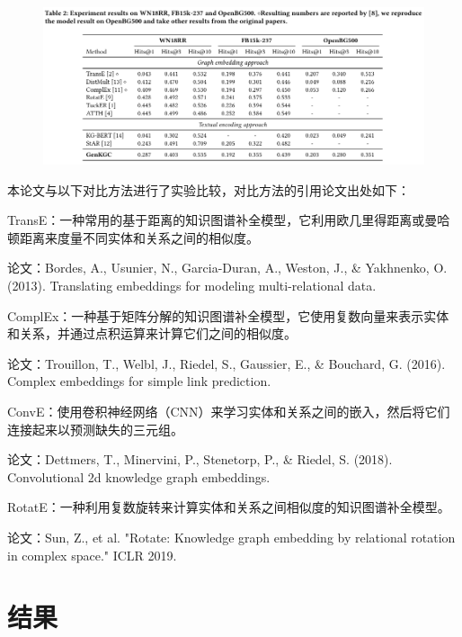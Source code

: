 \documentclass{article}
\begin{document}
\begin{figure}[htp]
        \centering
        \includegraphics[width=16cm]{模型对比.png}
        \caption{}
        \label{pic7}
\end{figure}
\par 本论文与以下对比方法进行了实验比较，对比方法的引用论文出处如下：
\par TransE：一种常用的基于距离的知识图谱补全模型，它利用欧几里得距离或曼哈顿距离来度量不同实体和关系之间的相似度。
\par
论文：Bordes, A., Usunier, N., Garcia-Duran, A., Weston, J., & Yakhnenko, O. (2013). Translating embeddings for modeling multi-relational data.
\par
ComplEx：一种基于矩阵分解的知识图谱补全模型，它使用复数向量来表示实体和关系，并通过点积运算来计算它们之间的相似度。
\par 论文：Trouillon, T., Welbl, J., Riedel, S., Gaussier, E., & Bouchard, G. (2016). Complex embeddings for simple link prediction.

\par ConvE：使用卷积神经网络（CNN）来学习实体和关系之间的嵌入，然后将它们连接起来以预测缺失的三元组。
\par 论文：Dettmers, T., Minervini, P., Stenetorp, P., & Riedel, S. (2018). Convolutional 2d knowledge graph embeddings.

\par RotatE：一种利用复数旋转来计算实体和关系之间相似度的知识图谱补全模型。
\par 论文：Sun, Z., et al. "Rotate: Knowledge graph embedding by relational rotation in complex space." ICLR 2019.
\section{结果}
\end{document}
